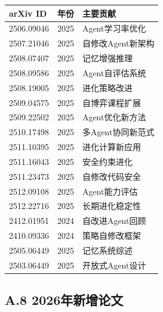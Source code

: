 \begin{longtable}{llp{7cm}}
\toprule
\textbf{arXiv ID} & \textbf{年份} & \textbf{主要贡献} \\
\midrule
2506.09046 & 2025 & Agent学习率优化 \\
2507.21046 & 2025 & 自修改Agent新架构 \\
2508.07407 & 2025 & 记忆增强推理 \\
2508.09586 & 2025 & Agent自评估系统 \\
2508.19005 & 2025 & 进化策略改进 \\
2509.04575 & 2025 & 自博弈课程扩展 \\
2509.22502 & 2025 & Agent优化新方法 \\
2510.17498 & 2025 & 多Agent协同新范式 \\
2511.10395 & 2025 & 进化计算新应用 \\
2511.16043 & 2025 & 安全约束进化 \\
2511.23473 & 2025 & 自修改代码安全 \\
2512.09108 & 2025 & Agent能力评估 \\
2512.22716 & 2025 & 长期进化稳定性 \\
2412.01951 & 2024 & 自改进Agent回顾 \\
2410.09336 & 2024 & 策略自修改框架 \\
2505.06449 & 2025 & 记忆系统综述 \\
2503.06449 & 2025 & 开放式Agent设计 \\
\bottomrule
\end{longtable}

\subsection*{A.8 2026年新增论文}

